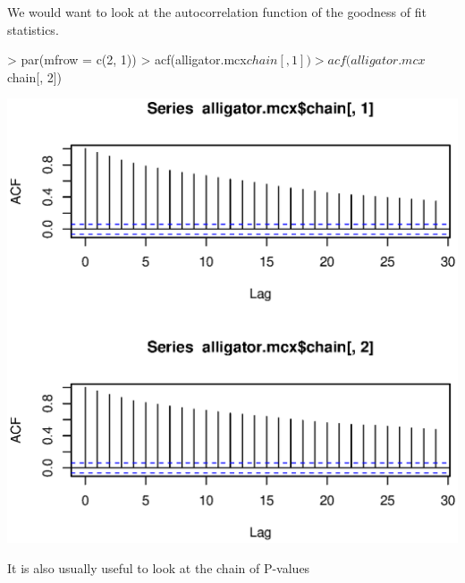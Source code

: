 \documentclass[a4paper]{article}
\begin{document}
We would want to look at the autocorrelation function of the goodness
of fit statistics.
\begin{center}
\begin{Schunk}
\begin{Sinput}
> par(mfrow = c(2, 1))
> acf(alligator.mcx$chain[, 1])
> acf(alligator.mcx$chain[, 2])
\end{Sinput}
\end{Schunk}
\includegraphics{exactLoglinTest-011}
\end{center}
It is also usually useful to look at the chain of P-values
\end{document}
